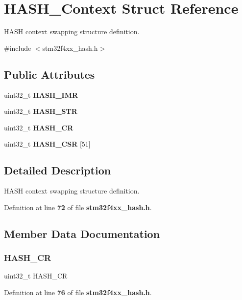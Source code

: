 \section{H\+A\+S\+H\+\_\+\+Context Struct Reference}
\label{structHASH__Context}


H\+A\+SH context swapping structure definition.  




{\ttfamily \#include $<$stm32f4xx\+\_\+hash.\+h$>$}

\subsection*{Public Attributes}
\begin{DoxyCompactItemize}
\item 
uint32\+\_\+t \textbf{ H\+A\+S\+H\+\_\+\+I\+MR}
\item 
uint32\+\_\+t \textbf{ H\+A\+S\+H\+\_\+\+S\+TR}
\item 
uint32\+\_\+t \textbf{ H\+A\+S\+H\+\_\+\+CR}
\item 
uint32\+\_\+t \textbf{ H\+A\+S\+H\+\_\+\+C\+SR} [51]
\end{DoxyCompactItemize}


\subsection{Detailed Description}
H\+A\+SH context swapping structure definition. 

Definition at line \textbf{ 72} of file \textbf{ stm32f4xx\+\_\+hash.\+h}.



\subsection{Member Data Documentation}
\mbox{\label{structHASH__Context_a079af6f7ef9899ca1e95abfa85ae3f20}} 
\subsubsection{H\+A\+S\+H\+\_\+\+CR}
{\footnotesize\ttfamily uint32\+\_\+t H\+A\+S\+H\+\_\+\+CR}



Definition at line \textbf{ 76} of file \textbf{ stm32f4xx\+\_\+hash.\+h}.

